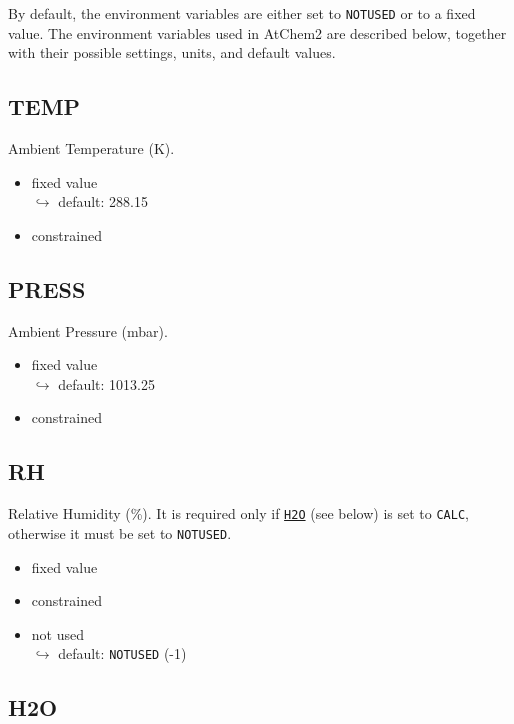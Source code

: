 By default, the environment variables are either set to
\texttt{NOTUSED} or to a fixed value. The environment variables used
in AtChem2 are described below, together with their possible settings,
units, and default values.

\subsection{TEMP} \label{subsec:temp}

Ambient Temperature (K).

\begin{itemize}
\item fixed value\\$\hookrightarrow$ default: 288.15
\item constrained
\end{itemize}

\subsection{PRESS} \label{subsec:press}

Ambient Pressure (mbar).

\begin{itemize}
\item fixed value\\$\hookrightarrow$ default: 1013.25
\item constrained
\end{itemize}

\subsection{RH} \label{subsec:rh}

Relative Humidity (\%). It is required only if
\hyperref[subsec:h2o]{\texttt{H2O}} (see below) is set to
\texttt{CALC}, otherwise it must be set to \texttt{NOTUSED}.

\begin{itemize}
\item fixed value
\item constrained
\item not used\\$\hookrightarrow$ default: \texttt{NOTUSED} (-1)
\end{itemize}

\subsection{H2O} \label{subsec:h2o}

